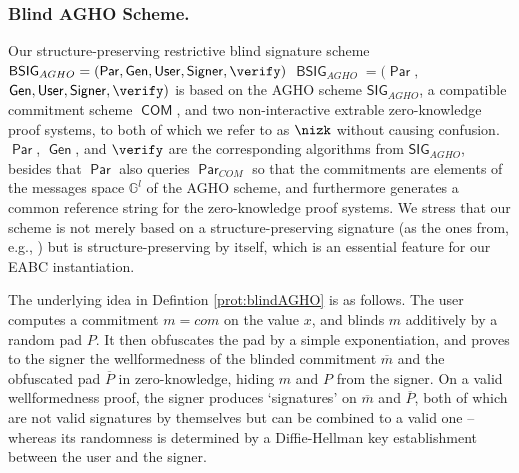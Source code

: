\documentclass[runningheads]{llncs}
\DeclareMathOperator{\user}{\mathsf{User}}
\DeclareMathOperator{\signer}{\mathsf{Signer}}
\DeclareMathOperator{\BSIG}{\ensuremath{\mathsf{BSIG}}}
\DeclareMathOperator{\COM}{\ensuremath{\mathsf{COM}}}
\DeclareMathOperator{\param}{\mathsf{Par}}
\DeclareMathOperator{\gen}{\mathsf{Gen}}
\begin{document}
\subsubsection{Blind AGHO Scheme.}
Our structure-preserving restrictive blind signature scheme 
\ifCANS
  $\BSIG_{AGHO} = (\param, \gen, \user, \signer, \verify)$
\else
  $\BSIG_{AGHO} = (\param,$ $\gen, \user, \signer, \verify)$
\fi  
is based on the AGHO scheme $\mathsf{SIG}_{AGHO}$, a compatible commitment scheme $\COM$, and two non-interactive extrable zero-knowledge proof systems, to both of which we refer to as $\nizk$ without causing confusion.
$\param$, $\gen$, and $\verify$ are the corresponding algorithms from $\mathsf{SIG}_{AGHO}$, besides that $\param$ also queries $\param_{COM}$ so  that the commitments are elements of the messages space $\mathbb G^l$ of the AGHO scheme, and furthermore generates a common reference string for the zero-knowledge proof systems.
%
We stress that our scheme is not merely based on a structure-preserving signature (as the ones from, e.g., \cite{AFGHO:2010,fuhasl15,fuhasl18}) but is structure-preserving by itself, which is an essential feature for our EABC instantiation. 

\ifCANS
\else
The underlying idea in Defintion \ref{prot:blindAGHO} is as follows.
The user computes a commitment $m=com$ on the value $x$, and blinds $m$ additively by a random pad $P$.
It then obfuscates the pad by a simple exponentiation, and proves to the signer the wellformedness of the blinded commitment $\overline m$ and the obfuscated pad $\overline P$ in zero-knowledge, hiding  $m$ and $P$ from the signer.
On a valid wellformedness proof, the signer produces `signatures' on $\overline m$ and $\overline P$, both of which are not valid signatures by themselves but can be combined to a valid one -- whereas its randomness is determined by a Diffie-Hellman key establishment between the user and the signer.
\fi
\end{document}
